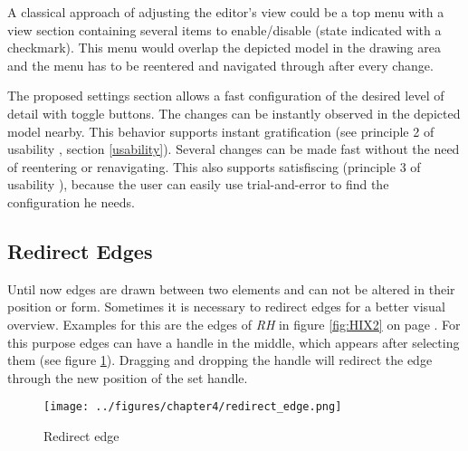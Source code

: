\documentclass[twoside, openright, 12pt]{book}
\begin{document}
\noindent
A classical approach of adjusting the editor's view could be a top menu with a view section containing several items to enable/disable (state indicated with a checkmark).
This menu would overlap the depicted model in the drawing area and the menu has to be reentered and navigated through after every change.

The proposed settings section allows a fast configuration of the desired level of detail with toggle buttons.
The changes can be instantly observed in the depicted model nearby.
This behavior supports instant gratification (see principle 2 of usability \citep{Tidwell11}, section \ref{usability}).
Several changes can be made fast without the need of reentering or renavigating.
This also supports satisfiscing (principle 3 of usability \citep{Tidwell11}), because the user can easily use trial-and-error to find the configuration he needs.


\subsection{Redirect Edges}
\label{editor_extension_redirect_edges}
Until now edges are drawn between two elements and can not be altered in their position or form.
Sometimes it is necessary to redirect edges for a better visual overview.
Examples for this are the edges of \textit{RH} in figure \ref{fig:HIX2} on page \pageref{fig:HIX2}.
For this purpose edges can have a handle in the middle, which appears after selecting them (see figure \ref{fig:redirect_edge}).
Dragging and dropping the handle will redirect the edge through the new position of the set handle.

\begin{figure}[htb]
	\centering
	\texttt{[image: ../figures/chapter4/redirect\_edge.png]}
	\caption{Redirect edge}
	\label{fig:redirect_edge}
\end{figure}
\end{document}
